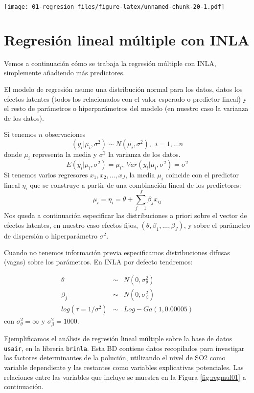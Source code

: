 \documentclass[
]{book}
\begin{document}
\texttt{[image: 01-regresion\_files/figure-latex/unnamed-chunk-20-1.pdf]}

\hypertarget{regresiuxf3n-lineal-muxfaltiple-con-inla}{%
\section{Regresión lineal múltiple con INLA}\label{regresiuxf3n-lineal-muxfaltiple-con-inla}}

Vemos a continuación cómo se trabaja la regresión múltiple con INLA, simplemente añadiendo más predictores.

El modelo de regresión asume una distribución normal para los datos, datos los efectos latentes (todos los relacionados con el valor esperado o predictor lineal) y el resto de parámetros o hiperparámetros del modelo (en nuestro caso la varianza de los datos).

Si tenemos \(n\) observaciones
\[ (y_i|\mu_i,\sigma^2) \sim N(\mu_i,\sigma^2), \ \ i=1,...n\]
donde \(\mu_i\) representa la media y \(\sigma^2\) la varianza de los datos.
\[E(y_i|\mu_i,\sigma^2)=\mu_i, \ Var(y_i|\mu_i,\sigma^2)=\sigma^2\]
Si tenemos varios regresores \(x_1,x_2,...,x_J\), la media \(\mu_i\) coincide con el predictor lineal \(\eta_i\) que se construye a partir de una combinación lineal de los predictores:
\[\mu_i=\eta_i=\theta+ \sum_{j=1}^J \beta_j x_{ij}\]
Nos queda a continuación especificar las distribuciones a priori sobre el vector de efectos latentes, en nuestro caso efectos fijos, \((\theta,\beta_1,...,\beta_J)\), y sobre el parámetro de dispersión o hiperparámetro \(\sigma^2\).

Cuando no tenemos información previa especificamos distribuciones difusas (vagas) sobre los parámetros. En INLA por defecto tendremos:

\begin{eqnarray*}
\theta &\sim& N(0,\sigma_{\theta}^2)  \\
\beta_j &\sim& N(0,\sigma_{\beta}^2) \\
log(\tau=1/\sigma^2) &\sim& Log-Ga(1,0.00005)
\end{eqnarray*}
con \(\sigma_{\theta}^2=\infty\) y \(\sigma_{\beta}^2=1000\).

Ejemplificamos el análisis de regresión lineal múltiple sobre la base de datos \texttt{usair}, en la librería \texttt{brinla}. Esta BD contiene datos recopilados para investigar los factores determinantes de la polución, utilizando el nivel de SO2 como variable dependiente y las restantes como variables explicativas potenciales. Las relaciones entre las variables que incluye se muestra en la Figura \ref{fig:regmul01} a continuación.
\end{document}
